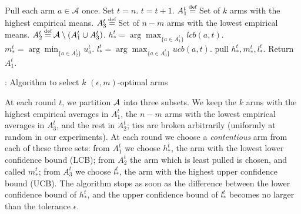 \begin{algorithm}[ht]
\begin{algorithmic}
\small{
 \STATE Pull each arm $a  \in \mathcal{A}$ once. Set $t = n$.
  { \label{ln:stpkoutofm}
     \STATE $t = t + 1$.
     \STATE $A_1^t \defeq $ Set of $k$ arms with the highest empirical means.
     \STATE $A_3^t \defeq $ Set of $n-m$ arms with the lowest empirical means.
     \STATE $A_2^t \defeq \mathcal{A} \setminus (A_1^t \cup A_3^t)$.
     \STATE $h_*^t = \arg \max_{\{a \in A_1^t\}} lcb(a,t)$.
     \STATE $m_*^t = \arg \min_{\{a \in A_2^t\}} u_a^{t}$.
     \STATE $l_*^t = \arg \max_{\{a \in A_3^t\}} ucb(a,t)$.
     \STATE pull  $h_*^t,  m_*^t, l_*^t$.
 }\ENDWHILE
 \STATE Return $A_1^t$.
 }
\end{algorithmic}
\caption{\GLUCB: Algorithm to select $k$ $(\epsilon, m)$-optimal arms}
\label{alg:glucb}
\end{algorithm}


At each round $t$, we partition $\mathcal{A}$ into three subsets. We keep the $k$ arms
with the highest empirical averages in $A_1^t$, the $n-m$ arms with the lowest empirical averages in $A_3^t$,
and the rest in $A_2^t$; ties are broken arbitrarily (uniformly at random in our experiments). At each round we choose
a \emph{contentious} arm from each of these three sets: from 
$A_1^t$ we choose $h_*^t$,
the arm with the lowest lower confidence bound (LCB); from $A_2^t$ the arm which is least pulled is chosen, and called $m_*^t$; from $A_3^t$ we choose $l_*^t$, the arm with the highest
upper confidence bound (UCB). The algorithm stops as soon as the difference between the lower 
confidence bound of $h_*^t$, and the upper confidence bound of $l_*^t$ becomes no larger than 
the tolerance $\epsilon$.

